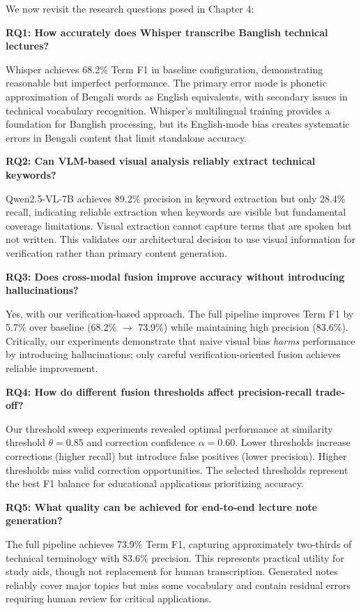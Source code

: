 We now revisit the research questions posed in Chapter 4:

\textbf{RQ1: How accurately does Whisper transcribe Banglish technical lectures?}

Whisper achieves 68.2\% Term F1 in baseline configuration, demonstrating reasonable but imperfect performance. The primary error mode is phonetic approximation of Bengali words as English equivalents, with secondary issues in technical vocabulary recognition. Whisper's multilingual training provides a foundation for Banglish processing, but its English-mode bias creates systematic errors in Bengali content that limit standalone accuracy.

\textbf{RQ2: Can VLM-based visual analysis reliably extract technical keywords?}

Qwen2.5-VL-7B achieves 89.2\% precision in keyword extraction but only 28.4\% recall, indicating reliable extraction when keywords are visible but fundamental coverage limitations. Visual extraction cannot capture terms that are spoken but not written. This validates our architectural decision to use visual information for verification rather than primary content generation.

\textbf{RQ3: Does cross-modal fusion improve accuracy without introducing hallucinations?}

Yes, with our verification-based approach. The full pipeline improves Term F1 by 5.7\% over baseline (68.2\% $\rightarrow$ 73.9\%) while maintaining high precision (83.6\%). Critically, our experiments demonstrate that naive visual bias \textit{harms} performance by introducing hallucinations; only careful verification-oriented fusion achieves reliable improvement.

\textbf{RQ4: How do different fusion thresholds affect precision-recall trade-off?}

Our threshold sweep experiments revealed optimal performance at similarity threshold $\theta = 0.85$ and correction confidence $\alpha = 0.60$. Lower thresholds increase corrections (higher recall) but introduce false positives (lower precision). Higher thresholds miss valid correction opportunities. The selected thresholds represent the best F1 balance for educational applications prioritizing accuracy.

\textbf{RQ5: What quality can be achieved for end-to-end lecture note generation?}

The full pipeline achieves 73.9\% Term F1, capturing approximately two-thirds of technical terminology with 83.6\% precision. This represents practical utility for study aids, though not replacement for human transcription. Generated notes reliably cover major topics but miss some vocabulary and contain residual errors requiring human review for critical applications.

